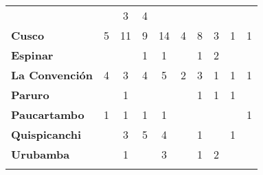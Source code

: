 \begin{tabular}{lccccccccc}
	&\cellcolor[HTML]{FCC46C}					&3
	&4											&\cellcolor[HTML]{FCC46C}
	&\cellcolor[HTML]{FCC46C}					&\cellcolor[HTML]{FCC46C}\\
	\textbf{Cusco}                            										
	&5
	&11											&9 	
	&14 										&4
	&8											&3
	&1											&1\\
	\textbf{Espinar}       					             									
	&\cellcolor[HTML]{FCC46C} 					&\cellcolor[HTML]{FCC46C}
	&1											&1
	&\cellcolor[HTML]{FCC46C}					&1
	&2											&\cellcolor[HTML]{FCC46C}	
	&\cellcolor[HTML]{FCC46C}\\
	\textbf{La Convención}                      					
	&4 											&3
	&4											&5
	&2											&3
	&1 											&1 
	&1\\
	\textbf{Paruro}                            
    &\cellcolor[HTML]{FCC46C}					
	&1
	&\cellcolor[HTML]{FCC46C}					&\cellcolor[HTML]{FCC46C}
	&\cellcolor[HTML]{FCC46C} 					&1
	&1											&1
	&\cellcolor[HTML]{FCC46C}\\
	\textbf{Paucartambo}               		                       					
	&1
	&1											&1		
	&1											&\cellcolor[HTML]{FCC46C}
	&\cellcolor[HTML]{FCC46C}
	&\cellcolor[HTML]{FCC46C}					&\cellcolor[HTML]{FCC46C}
	&1\\
	\textbf{Quispicanchi}                                         	                  		
	&\cellcolor[HTML]{FCC46C}
	&3											&5
	&4											&\cellcolor[HTML]{FCC46C}
	&1											&\cellcolor[HTML]{FCC46C}
	&1											&\cellcolor[HTML]{FCC46C}\\
	\textbf{Urubamba}                                                          				
	&\cellcolor[HTML]{FCC46C}					&1
	&\cellcolor[HTML]{FCC46C}					&3
	&\cellcolor[HTML]{FCC46C}					&1
	&2											&\cellcolor[HTML]{FCC46C}
	&\cellcolor[HTML]{FCC46C}\\	
	&\multicolumn{1}{l}{}                       &\multicolumn{1}{l}{}            &\multicolumn{1}{l}{}                         
	&\multicolumn{1}{l}{}                       &\multicolumn{1}{l}{}            &\multicolumn{1}{l}{}                       &\multicolumn{1}{l}{}                       &\multicolumn{1}{l}{}            &\multicolumn{1}{l}{}    
\end{tabular}
